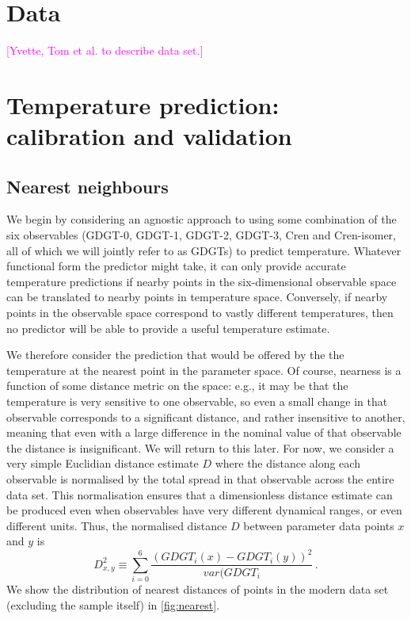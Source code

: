 \documentclass[rmp,aps,twocolumn]{revtex4-1}
\newcommand{\ilya}[1]{\textcolor{magenta}{#1}}
\def\be{\begin{equation}}
\def\ee{\end{equation}}
\begin{document}
\section{Data}

\ilya{[Yvette, Tom et al. to describe data set.]}

\section{Temperature prediction: calibration and validation}

\subsection{Nearest neighbours}

We begin by considering an agnostic approach to using some combination of the six observables (GDGT-0, GDGT-1, GDGT-2, GDGT-3, Cren and Cren-isomer, all of which we will jointly refer to as GDGTs) to predict temperature.  Whatever functional form the predictor might take, it can only provide accurate temperature predictions if nearby points in the six-dimensional observable space can be translated to nearby points in temperature space.  Conversely, if nearby points in the observable space correspond to vastly different temperatures, then no predictor will be able to provide a useful temperature estimate.

We therefore consider the prediction that would be offered by the the temperature at the nearest point in the parameter space.  Of course, nearness is a function of some distance metric on the space: e.g., it may be that the temperature is very sensitive to one observable, so even a small change in that observable corresponds to a significant distance, and rather insensitive to another, meaning that even with a large difference in the nominal value of that observable the distance is insignificant.  We will return to this later.  For now, we consider a very simple Euclidian distance estimate $D$ where the distance along each observable is normalised by the total spread in that observable across the entire data set.  This normalisation ensures that a dimensionless distance estimate can be produced even when observables have very different dynamical ranges, or even different units.  Thus, the normalised distance $D$ between parameter data points $x$ and $y$ is
\be\label{eq:dist}
D_{x,y}^2 \equiv \sum_{i=0}^{6} \frac{(GDGT_{i} (x) - GDGT_{i} (y) )^2}{var(GDGT_{i}} \, .
\ee
We show the distribution of nearest distances of points in the modern data set (excluding the sample itself) in \autoref{fig:nearest}.  
\end{document}
